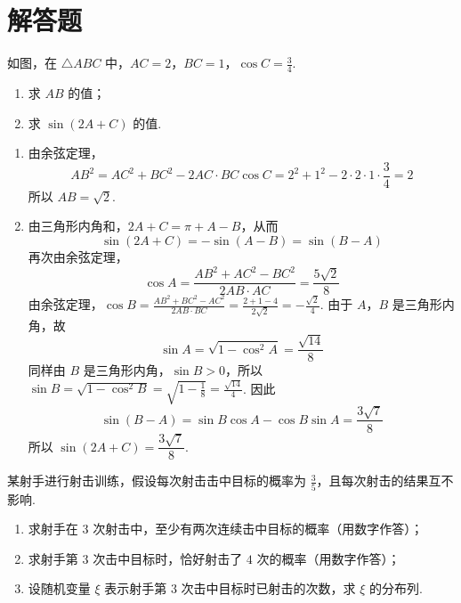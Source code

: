 \section{解答题}
\begin{problem}
如图，在 \(\triangle ABC\) 中，\(AC=2\)，\(BC=1\)，\(\cos C=\frac{3}{4}\).

\begin{enumerate}
\item 求 \(AB\) 的值；
\item 求 \(\sin(2A+C)\) 的值.
\end{enumerate}

\end{problem}

\begin{solution}
\begin{enumerate}
\item 由余弦定理，
\[
AB^{2}=AC^{2}+BC^{2}-2AC\cdot BC\cos C=2^{2}+1^{2}-2\cdot2\cdot1\cdot\frac34=2
\]
所以 \(AB=\sqrt2\).
\item 由三角形内角和，\(2A+C=\pi+A-B\)，从而
\[
\sin(2A+C)=-\sin(A-B)=\sin(B-A)
\]
再次由余弦定理，
\[
\cos A=\frac{AB^{2}+AC^{2}-BC^{2}}{2AB\cdot AC}=\frac{5\sqrt2}{8}
\]
由余弦定理，\(\cos B=\frac{AB^{2}+BC^{2}-AC^{2}}{2AB\cdot BC}=\frac{2+1-4}{2\sqrt2}=-\frac{\sqrt2}{4}\).
由于 \(A\)，\(B\) 是三角形内角，故
\[
\sin A=\sqrt{1-\cos^{2}A}=\frac{\sqrt{14}}{8}
\]
同样由 \(B\) 是三角形内角，\(\sin B>0\)，所以 \(\sin B=\sqrt{1-\cos^{2}B}=\sqrt{1-\frac18}=\frac{\sqrt{14}}{4}\).
因此
\[
\sin(B-A)=\sin B\cos A-\cos B\sin A=\frac{3\sqrt7}{8}
\]
所以 \(\sin(2A+C)=\dfrac{3\sqrt7}{8}\).
\end{enumerate}
\end{solution}

\begin{problem}
某射手进行射击训练，假设每次射击击中目标的概率为 \(\frac{3}{5}\)，且每次射击的结果互不影响.

\begin{enumerate}
\item 求射手在 \(3\) 次射击中，至少有两次连续击中目标的概率（用数字作答）；
\item 求射手第 \(3\) 次击中目标时，恰好射击了 \(4\) 次的概率（用数字作答）；
\item 设随机变量 \(\xi\) 表示射手第 \(3\) 次击中目标时已射击的次数，求 \(\xi\) 的分布列.
\end{enumerate}
\end{problem}

